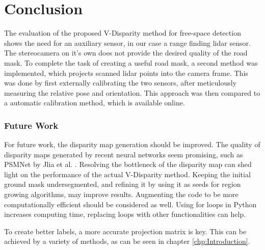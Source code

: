 
\chapter{Conclusion}
\label{chp:Conclusion}

The evaluation of the proposed V-Disparity method for free-space detection shows the need for an auxiliary sensor, in our case a range finding lidar sensor. The stereocamera on it's own does not provide the desired quality of the road mask. To complete the task of creating a useful road mask, a second method was implemented, which projects scanned lidar points into the camera frame. This was done by first externally calibrating the two sensors, after meticulously measuring the relative pose and orientation. This approach was then compared to a automatic calibration method, which is available online.

\subsection{Future Work}
For future work, the disparity map generation should be improved. The quality of disparity maps generated by recent neural networks seem promising, such as PSMNet by Jlia et al.  \cite{DBLP:journals/corr/abs-1803-08669}. Resolving the bottleneck of the disparity map can shed light on the performance of the actual V-Disparity method. Keeping the initial ground mask undersegmented, and refining it by using it as seeds for region growing algorithms, may improve results.
Augmenting the code to be more computationally efficient should be considered as well. Using for loops in Python increases computing time, replacing loops with other functionalities can help.

To create better labels, a more accurate projection matrix is key. This can be achieved by a variety of methods, as can be seen in chapter \ref{chp:Introduction}.
